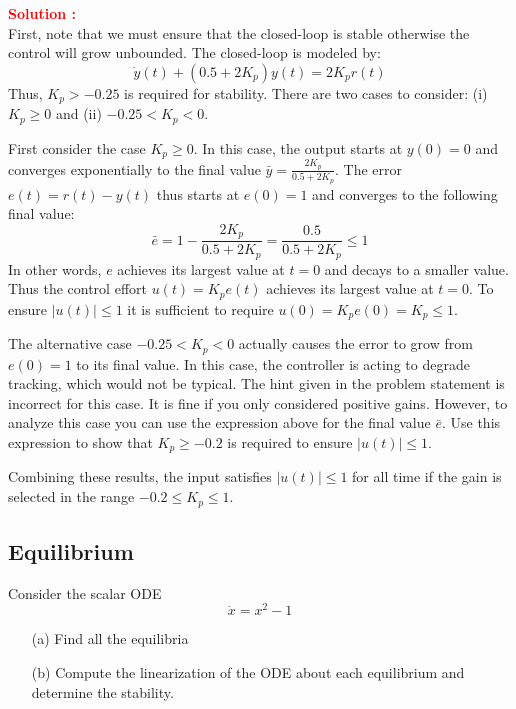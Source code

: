 \documentclass[12pt]{article}
\begin{document}
\textbf{\textcolor{red}{Solution :}} \\
First, note that we must ensure that the closed-loop is stable otherwise the control will grow unbounded. The closed-loop is modeled by:
\begin{equation}
\dot{y}(t) + (0.5 + 2K_p)y(t) = 2K_pr(t)
\end{equation}
Thus, \(K_p > -0.25\) is required for stability. There are two cases to consider: (i) \(K_p \geq 0\) and (ii) \(-0.25 < K_p < 0\).

First consider the case \(K_p \geq 0\). In this case, the output starts at \(y(0) = 0\) and converges exponentially to the final value \(\bar{y} = \frac{2K_p}{0.5+2K_p}\). The error \(e(t) = r(t) - y(t)\) thus starts at \(e(0) = 1\) and converges to the following final value:
\begin{equation}
\bar{e} = 1 - \frac{2K_p}{0.5 + 2K_p} = \frac{0.5}{0.5 + 2K_p} \leq 1
\end{equation}
In other words, \(e\) achieves its largest value at \(t = 0\) and decays to a smaller value. Thus the control effort \(u(t) = K_pe(t)\) achieves its largest value at \(t = 0\). To ensure \(|u(t)| \leq 1\) it is sufficient to require \(u(0) = K_pe(0) = K_p \leq 1\).

The alternative case \(-0.25 < K_p < 0\) actually causes the error to grow from \(e(0) = 1\) to its final value. In this case, the controller is acting to degrade tracking, which would not be typical. The hint given in the problem statement is incorrect for this case. It is fine if you only considered positive gains. However, to analyze this case you can use the expression above for the final value \(\bar{e}\). Use this expression to show that \(K_p \geq -0.2\) is required to ensure \(|u(t)| \leq 1\).

Combining these results, the input satisfies \(|u(t)| \leq 1\) for all time if the gain is selected in the range \(-0.2 \leq K_p \leq 1\).

\clearpage
\subsection{Equilibrium}

Consider the scalar ODE
\begin{equation}
    \dot{x} = x^2-1
\end{equation}
\begin{enumerate}
    \item[(a)] Find all the equilibria
    \item[(b)] Compute the linearization of the ODE about each equilibrium and determine the stability.
\end{enumerate}
\end{document}
